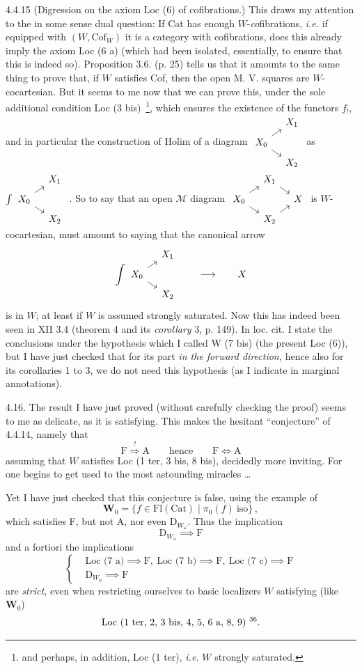 \documentclass[11pt]{article}
\newcommand{\printedpage}[1]{\marginpar{\footnotesize p.~#1}}
\newcommand{\msp}[1]{\marginpar{\footnotesize [#1]}}
\newcommand{\fourche}{\begin{tikzcd}[ampersand replacement=\&, row sep=0.5em, column sep=1em, baseline=(\tikzcdmatrixname-2-1.base)]
 \& X_1 \\
 X_0 \arrow[ur] \arrow[dr] \& \\
 \& X_2
\end{tikzcd}}
\newcommand{\carre}{\begin{tikzcd}[ampersand replacement=\&, row sep=0.5em, column sep=1em, baseline=(\tikzcdmatrixname-2-1.base)]
 \& X_1 \arrow[dr] \& \\
 X_0 \arrow[ur] \arrow[dr] \& \& X \\
 \& X_2 \arrow[ur] \&
\end{tikzcd}}
\begin{document}
4.4.15 (Digression on the axiom Loc (6) of cofibrations.) This draws my attention to the in some sense dual question: If Cat has enough $W$-\textit{co}fibrations, \textit{i.e.} if equipped with $(W,\mathrm{Cof}_W)$ it is a category with cofibrations, does this already imply the axiom Loc (6 a) (which had been isolated, essentially, to ensure that this is indeed so). Proposition 3.6. (p. 25) tells us that it amounts to the same thing to prove that, if $W$ satisfies Cof, then the open M. V. squares are
\msp{page 67}%
$W$-cocartesian. But it seems to me now that we can prove this, under the sole additional condition Loc (3 bis)~\footnote[35]{and perhaps, in addition, Loc (1 ter), \textit{i.e.} $W$ strongly saturated.}, which ensures the existence of the functors $f_!$, and %
\printedpage{38}%
in particular the construction of Holim of a diagram $\fourche$ \quad as $\int\fourche$ \quad .
So to say that an open $\mathcal{M}$ diagram $\carre$ is $W$-cocartesian, must amount to saying that the canonical arrow
\[
\int\fourche \qquad \longrightarrow \qquad X
\]
is in $W$; at least if $W$ is assumed strongly saturated. Now this has indeed been seen in XII 3.4 (theorem 4 and its \textit{corollary} 3, p. 149). In loc. cit. I state the conclusions under the hypothesis which I called W (7 bis) (the present Loc (6)), but I have just checked that for its part \textit{in the forward direction,} hence also for its corollaries 1 to 3, we do not need
\msp{page 68}%
this hypothesis (as I indicate in marginal annotations).

4.16. The result I have just proved (without carefully checking the proof) seems to me as delicate, as it is satisfying. This makes the hesitant ``conjecture'' of 4.4.14, namely that
\[
\mathrm{F} \overset{?}{\Longrightarrow} \mathrm{A} \qquad \text{hence} \qquad \mathrm{F}\Longleftrightarrow\mathrm{A}
\]
assuming that $W$ satisfies Loc (1 ter, 3 bis, 8 bis), decidedly more inviting. For one begins to get used to the most astounding miracles \ldots

Yet I have just checked that this conjecture is false, using the example of
\[
\mathbf{W}_0=\{f\in\mathrm{Fl}(\mathrm{Cat})\mid\pi_0(f)\ \mathrm{iso}\}\,,
\]
which satisfies F, but not A, nor even $\mathrm{D}_{W_\omega}$. Thus the implication
\[
\mathrm{D}_{W_\omega} \implies \mathrm{F}
\]
and a fortiori the implications
\[
\left\{
\begin{aligned}
&\text{Loc (7 a)} \implies \mathrm{F},\ \text{Loc (7 b)} \implies \mathrm{F},\ \text{Loc (7 c)} \implies \mathrm{F}\\
&\mathrm{D}_{W_0} \implies \mathrm{F}
\end{aligned}
\right.
\]
are \textit{strict,} even when restricting ourselves to basic localizers $W$ satisfying (like $\mathbf{W}_0$)
\[
\text{Loc (1 ter, 2, 3 bis, 4, 5, 6 a, 8, 9)}\ \text{\footnotemark[36]}.
\]
\end{document}
